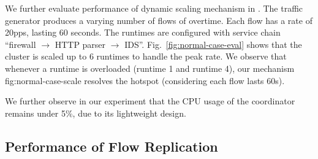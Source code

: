 We further evaluate performance of dynamic scaling mechanism in \nfactor. The traffic generator produces a varying number of flows of overtime. %
Each flow has a rate of 20pps, lasting 60 seconds. The runtimes are configured with service chain ``firewall $\rightarrow$ HTTP parser $\rightarrow$ IDS''. Fig.~\ref{fig:normal-case-eval} shows that the cluster is scaled up to 6 runtimes to handle the peak rate. We observe that whenever a runtime is overloaded (runtime 1 and runtime 4), our mechanism  fig:normal-case-scale resolves the hotspot (considering each flow lasts 60s). %

We further observe in our experiment that the CPU usage of the coordinator remains under 5\%, due to its lightweight design.


\subsection{Performance of Flow Replication}
\label{sec:rp}

